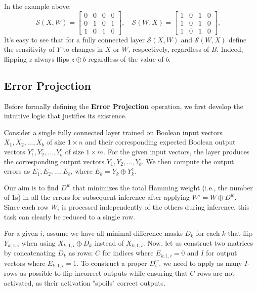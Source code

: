 \documentclass[pmlr]{jmlr}
\begin{document}
In the example above:
\[
    \mathcal{S}(X, W) = \begin{bmatrix} 0 & 0 & 0 & 0 \\ 0 & 1 & 0 & 1 \\ 1 & 0 & 1 & 0 \end{bmatrix}, \quad
    \mathcal{S}(W, X) = \begin{bmatrix} 1 & 0 & 1 & 0 \\ 1 & 0 & 1 & 0 \\ 1 & 0 & 1 & 0 \end{bmatrix},
\]
It's easy to see that for a fully connected layer \( \mathcal{S}(X, W) \) and \( \mathcal{S}(W, X) \) define the sensitivity of \( Y \) to changes in \( X \) or \( W \), respectively, regardless of \( B \). Indeed, flipping \( z \) always flips \( z \oplus b \) regardless of the value of \( b \).

\subsection{Error Projection}
Before formally defining the \textbf{Error Projection} operation, we first develop the intuitive logic that justifies its existence.

Consider a single fully connected layer trained on Boolean input vectors \( X_1, X_2, \dots, X_b \) of size \( 1 \times n \) and their corresponding expected Boolean output vectors \( Y^e_1, Y^e_2, \dots, Y^e_b \) of size \( 1 \times m \). For the given input vectors, the layer produces the corresponding output vectors \( Y_1, Y_2, \dots, Y_b \). We then compute the output errors as \( E_1, E_2, \dots, E_b \), where \( E_k = Y_k \oplus Y^e_k \).

Our aim is to find \( D^w \) that minimizes the total Hamming weight (i.e., the number of 1s) in all the errors for subsequent inference after applying \( W' = W \oplus D^w \). Since each row \( W_i \) is processed independently of the others during inference, this task can clearly be reduced to a single row.

For a given \( i \), assume we have all minimal difference masks \( D_k \) for each \( k \) that flip \( Y_{k,1,i} \) when using \( X_{k,1,i} \oplus D_k \) instead of \( X_{k,1,i} \). Now, let us construct two matrices by concatenating \( D_k \) as rows: \( C \) for indices where \( E_{k,1,i} = 0 \) and \( I \) for output vectors where \( E_{k,1,i} = 1 \). To construct a proper \( D^w_i \), we need to apply as many \( I \)-rows as possible to flip incorrect outputs while ensuring that \( C \)-rows are not activated, as their activation "spoils" correct outputs.
\end{document}
